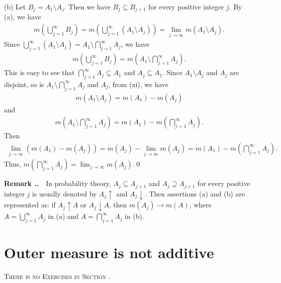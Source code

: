 \documentclass{book}
\newcommand{\remark}{\vspace{.5em}\noindent\textbf{Remark \textbf{\theExercise}}~~}
\newcounter{Exercise}[section]
\renewcommand{\theExercise}{\thesection.\arabic{Exercise}.}
\begin{document}
(b) Let $B_j = A_1 \setminus A_j$. Then we have $B_j \subseteq B_{j+1}$ for every positive integer $j$. By (a), we have
    \begin{align*}
        m\left( \bigcup_{j = 1}^{\infty} B_j \right)
        = m\left( \bigcup_{j = 1}^{\infty} (A_1 \setminus A_j) \right)
        = \lim_{j \to \infty} m(A_1 \setminus A_j).
    \end{align*}
Since $\bigcup_{j = 1}^{\infty} (A_1 \setminus A_j) = A_1 \setminus \bigcap_{j = 1}^{\infty} A_j$, we have
    \begin{align*}
        m\left( \bigcup_{j = 1}^{\infty} B_j \right)
        = m\left( A_1 \setminus \bigcap_{j = 1}^{\infty} A_j \right).
    \end{align*}
This is easy to see that $\bigcap_{j = 1}^{\infty} A_j \subseteq A_1$ and $A_j \subseteq A_1$. Since $A_1 \setminus A_j$ and $A_j$ are disjoint, so is $A_1 \setminus \bigcap_{j = 1}^{\infty} A_j$ and $A_j$, from (xi), we have
    \begin{align*}
        m(A_1 \setminus A_j) = m(A_1) - m(A_j) 
    \end{align*}
and
    \begin{align*}
        m\left( A_1 \setminus \bigcap_{j = 1}^{\infty} A_j \right)
        = m(A_1) - m\left( \bigcap_{j = 1}^{\infty} A_j \right).
    \end{align*}
Then
    \begin{align*}
        \lim_{j \to \infty} (m(A_1) - m(A_j))
        = m(A_j) - \lim_{j \to \infty} m(A_j)
        = m(A_1) - m\left( \bigcap_{j = 1}^{\infty} A_j \right).
    \end{align*}
Thus, $m(\bigcap_{j=1}^{\infty} A_j) = \lim_{j \to \infty} m(A_j)$.\qed

\remark In probability theory, $A_j \subseteq A_{j+1}$ and $A_j \supseteq A_{j+1}$ for every positive integer $j$ is usually denoted by $A_j \uparrow$ and $A_j \downarrow$. Then assertions (a) and (b) are represented as: if $A_j \uparrow A$ or $A_j \downarrow A$, then $m(A_j) \to m(A)$, where $A = \bigcup_{j = 1}^{\infty} A_j$ in (a) and $A = \bigcap_{j = 1}^{\infty} A_j$ in (b).

\section{Outer measure is not additive}

\begin{center}
    \textsc{There is no Exercises in Section \thesection.}
\end{center}
\end{document}
